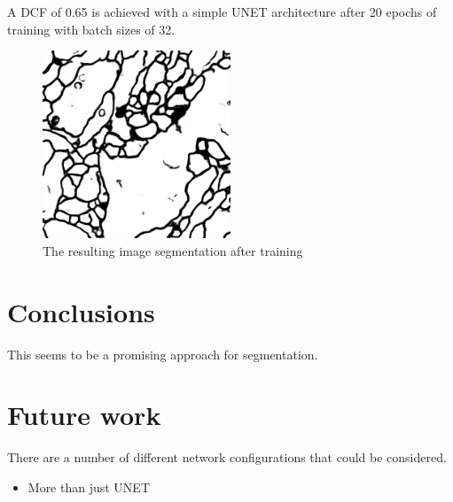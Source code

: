 \documentclass[letterpaper]{article}
\begin{document}
A DCF of 0.65 is achieved with a simple UNET architecture after 20 epochs of training with batch sizes of 32. 

 \begin{figure}[H]
  \centerline{\includegraphics[width=0.5\textwidth]{Images/MRISegment.png}}
  \caption{The resulting image segmentation after training}
  \label{fig:mrisegment}
\end{figure}

\section{Conclusions}
This seems to be a promising approach for segmentation.
\section{Future work}
There are a number of different network configurations that could be considered. 
\begin{itemize}
  \item More than just UNET 
\end{itemize}


\end{document}
